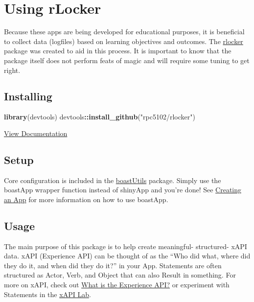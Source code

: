 \documentclass[
]{book}
\newenvironment{Shaded}{\begin{snugshade}}{\end{snugshade}}
\newcommand{\KeywordTok}[1]{\textcolor[rgb]{0.13,0.29,0.53}{\textbf{#1}}}
\newcommand{\NormalTok}[1]{#1}
\newcommand{\OperatorTok}[1]{\textcolor[rgb]{0.81,0.36,0.00}{\textbf{#1}}}
\newcommand{\StringTok}[1]{\textcolor[rgb]{0.31,0.60,0.02}{#1}}
\begin{document}
\hypertarget{rlocker}{%
\section{Using rLocker}\label{rlocker}}

Because these apps are being developed for educational purposes, it is beneficial to collect data (logfiles) based on learning objectives and outcomes. The \href{https://github.com/rpc5102/rlocker}{rlocker} package was created to aid in this process. It is important to know that the package itself does not perform feats of magic and will require some tuning to get right.

\hypertarget{installing}{%
\subsection{Installing}\label{installing}}

\begin{Shaded}
\begin{Highlighting}[]
\KeywordTok{library}\NormalTok{(devtools)}
\NormalTok{devtools}\OperatorTok{::}\KeywordTok{install_github}\NormalTok{(}\StringTok{"rpc5102/rlocker"}\NormalTok{)}
\end{Highlighting}
\end{Shaded}

\href{https://github.com/rpc5102/rlocker\#Installation}{View Documentation}

\hypertarget{setup}{%
\subsection{Setup}\label{setup}}

Core configuration is included in the \href{https://github.com/EducationShinyAppTeam/boastUtils}{boastUtils} package. Simply use the boastApp wrapper function instead of shinyApp and you're done! See \href{https://github.com/EducationShinyAppTeam/boastUtils\#creating-an-app}{Creating an App} for more information on how to use boastApp.

\hypertarget{usage}{%
\subsection{Usage}\label{usage}}

The main purpose of this package is to help create meaningful- structured- xAPI data. xAPI (Experience API) can be thought of as the ``Who did what, where did they do it, and when did they do it?'' in your App. Statements are often structured as Actor, Verb, and Object that can also Result in something. For more on xAPI, check out \href{https://xapi.com/overview/}{What is the Experience API?} or experiment with Statements in the \href{https://adlnet.github.io/xapi-lab/}{xAPI Lab}.
\end{document}
